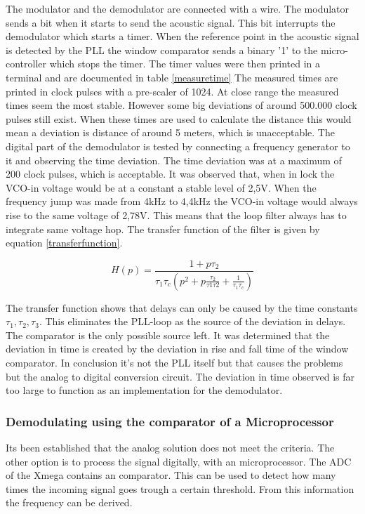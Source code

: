 \documentclass[10pt,a4paper]{article}
\begin{document}
The modulator and the demodulator are connected with a wire. The modulator sends a bit when it starts to send the acoustic signal. This bit interrupts the demodulator which starts a timer. When the reference point in the acoustic signal is detected by the PLL the window comparator sends a binary '1' to the micro-controller which stops the timer. The timer values were then printed in a terminal and are documented in table \ref{measuretime} The measured times are printed in clock pulses with a pre-scaler of 1024. At close range the measured times seem the most stable. However some big deviations of around 500.000 clock pulses still exist. When these times are used to calculate the distance this would mean a deviation is distance of around 5 meters, which is unacceptable. The digital part of the demodulator is tested by connecting a frequency generator to it and observing the time deviation. The time deviation was at a maximum of 200 clock pulses, which is acceptable. It was observed that, when in lock the VCO-in voltage would be at a constant a stable level of 2,5V. When the frequency jump was made from 4kHz to 4,4kHz the VCO-in voltage would always rise to the same voltage of 2,78V. This means that the loop filter always has to integrate same voltage hop. The transfer function of the filter is given by equation \ref{transferfunction}\cite{plldavid}.

\begin{equation}
H(p)=\frac{1+ p\tau_2}{\tau_1\tau_c(p^2+p\frac{\tau_2}{\tau1\tau2}+\frac{1}{\tau_1\tau_c})}
\label{eq:transferfunction}
\end{equation}

The transfer function shows that delays can only be caused by the time constants $\tau_1,\tau_2,\tau_3$. This eliminates the PLL-loop as the source of the deviation in delays. The comparator is the only possible source left. It was determined that the deviation in time is created by the deviation in rise and fall time of the window comparator. In conclusion it's not the PLL itself but that causes the problems but the analog to digital conversion circuit. The deviation in time observed is far too large to function as an implementation for the demodulator.

\subsubsection{Demodulating using the comparator of a Microprocessor}
Its been established that the analog solution does not meet the criteria. The other option is to process the signal digitally, with an microprocessor. The ADC of the Xmega contains an comparator. This can be used to detect how many times the incoming signal goes trough a certain threshold. From this information the frequency can be derived. 
\end{document}
